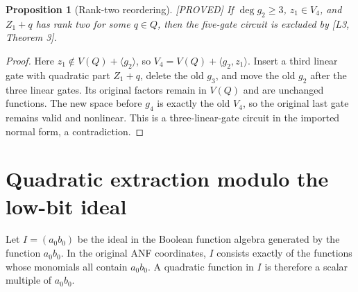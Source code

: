 \documentclass[11pt,a4paper]{article}
\newtheorem{proposition}[theorem]{Proposition}
\newcommand{\status}[1]{\hfill\textsf{[#1]}}
\begin{document}
\begin{proposition}[Rank-two reordering]\label{prop:reorder}\status{PROVED}
If $\deg g_2\ge3$, $z_1\in V_4$, and $Z_1+q$ has rank two for some $q\in Q$, then the five-gate circuit is excluded by [L3, Theorem 3].
\end{proposition}
\begin{proof}
Here $z_1\notin V(Q)+\langle g_2\rangle$, so $V_4=V(Q)+\langle g_2,z_1\rangle$. Insert a third linear gate with quadratic part $Z_1+q$, delete the old $g_3$, and move the old $g_2$ after the three linear gates. Its original factors remain in $V(Q)$ and are unchanged functions. The new space before $g_4$ is exactly the old $V_4$, so the original last gate remains valid and nonlinear. This is a three-linear-gate circuit in the imported normal form, a contradiction.
\end{proof}

\section{Quadratic extraction modulo the low-bit ideal}
Let $I=(a_0b_0)$ be the ideal in the Boolean function algebra generated by the function $a_0b_0$. In the original ANF coordinates, $I$ consists exactly of the functions whose monomials all contain $a_0b_0$. A quadratic function in $I$ is therefore a scalar multiple of $a_0b_0$.
\end{document}
